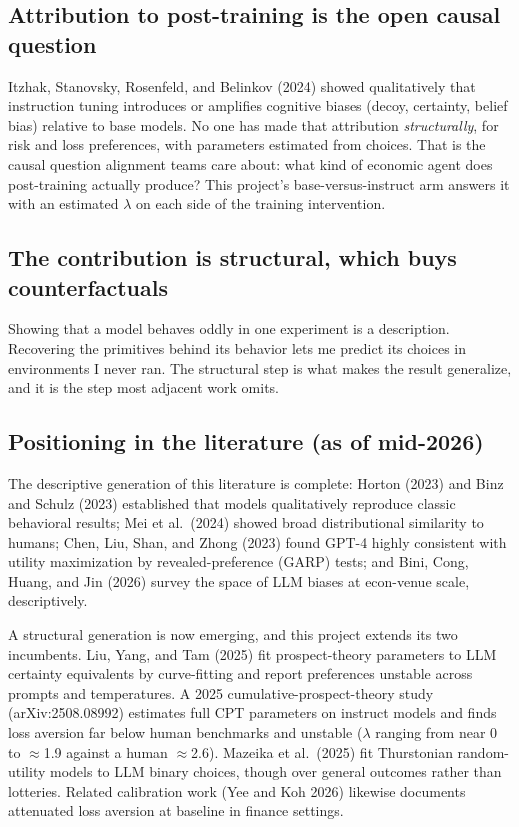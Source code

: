\documentclass[11pt]{article}
\begin{document}
\subsection{Attribution to post-training is the open causal question}
Itzhak, Stanovsky, Rosenfeld, and Belinkov (2024) showed qualitatively that instruction tuning
introduces or amplifies cognitive biases (decoy, certainty, belief bias) relative to base models. No
one has made that attribution \emph{structurally}, for risk and loss preferences, with parameters
estimated from choices. That is the causal question alignment teams care about: what kind of economic
agent does post-training actually produce? This project's base-versus-instruct arm answers it with an
estimated $\lambda$ on each side of the training intervention.

\subsection{The contribution is structural, which buys counterfactuals}
Showing that a model behaves oddly in one experiment is a description. Recovering the primitives
behind its behavior lets me predict its choices in environments I never ran. The structural step is
what makes the result generalize, and it is the step most adjacent work omits.

\subsection{Positioning in the literature (as of mid-2026)}
The descriptive generation of this literature is complete: Horton (2023) and Binz and Schulz (2023)
established that models qualitatively reproduce classic behavioral results; Mei et al.\ (2024) showed
broad distributional similarity to humans; Chen, Liu, Shan, and Zhong (2023) found GPT-4 highly
consistent with utility maximization by revealed-preference (GARP) tests; and Bini, Cong, Huang, and
Jin (2026) survey the space of LLM biases at econ-venue scale, descriptively.

A structural generation is now emerging, and this project extends its two incumbents. Liu, Yang, and
Tam (2025) fit prospect-theory parameters to LLM certainty equivalents by curve-fitting and report
preferences unstable across prompts and temperatures. A 2025 cumulative-prospect-theory study
(arXiv:2508.08992) estimates full CPT parameters on instruct models and finds loss aversion far below
human benchmarks and unstable ($\lambda$ ranging from near 0 to $\approx$1.9 against a human
$\approx$2.6). Mazeika et al.\ (2025) fit Thurstonian random-utility models to LLM binary choices,
though over general outcomes rather than lotteries. Related calibration work (Yee and Koh 2026)
likewise documents attenuated loss aversion at baseline in finance settings.
\end{document}
